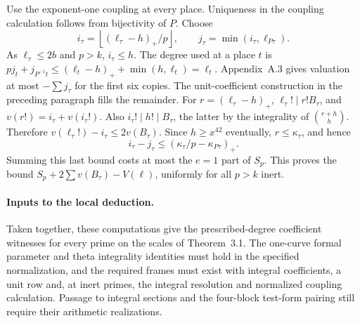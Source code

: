 Use the exponent-one coupling at every place. Uniqueness in the
coupling calculation follows from bijectivity of $P$. Choose
\[
 i_\tau=\left\lfloor (\ell_\tau-h)_+/p\right\rfloor,\qquad
 j_\tau=\min(i_\tau,\ell_{P\tau}).
\]
As $\ell_\tau\le2b$ and $p>k$, $i_\tau\le h$.
The degree used at a place $t$ is
$p j_t+j_{P^{-1}t}\le(\ell_t-h)_++\min(h,\ell_t)=\ell_t$.
Appendix~A.3 gives valuation at most $-\sum j_\tau$ for the first
six copies. The unit-coefficient construction in the preceding
paragraph fills the remainder. For $r=(\ell_\tau-h)_+$,
$\ell_\tau!\mid r! B_\tau$, and
$v(r!)=i_\tau+v(i_\tau!)$. Also $i_\tau!\mid h!\mid B_\tau$,
the latter by the integrality of $\binom{r+h}{h}$.
Therefore $v(\ell_\tau!)-i_\tau\le 2v(B_\tau)$.
Since $h\ge x^{42}$ eventually, $r\le\kappa_\tau$, and hence
\[
 i_\tau-j_\tau\le(\kappa_\tau/p-\kappa_{P\tau})_+ .
\]
Summing this last bound costs at most the $e=1$ part of $S_p$.
This proves the bound $S_p+2\sum v(B_\tau)-V(\ell)$, uniformly for
all $p>k$ inert.

\paragraph{Inputs to the local deduction.}
Taken together, these computations give the prescribed-degree
coefficient witnesses for every prime on the scales of Theorem~3.1.
The one-curve formal parameter and theta integrality identities must
hold in the specified normalization, and the required frames must exist
with integral coefficients, a unit row and, at inert primes, the
integral resolution and normalized coupling calculation.
Passage to integral sections and the four-block test-form pairing
still require their arithmetic realizations.
